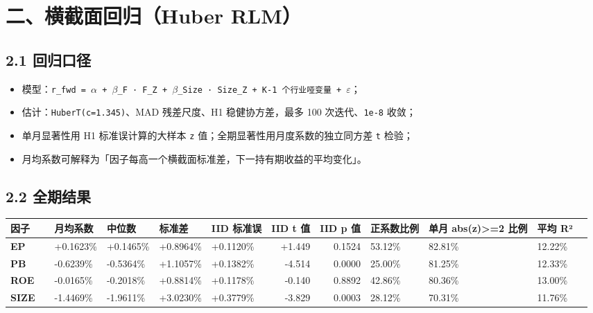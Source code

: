 \documentclass[UTF8,a4paper,11pt]{ctexart}
\begin{document}
{}
\section*{二、横截面回归（Huber RLM）}

{}
\subsection*{2.1 回归口径}

\begin{itemize}[leftmargin=2em,itemsep=2pt,topsep=3pt]
\item 
模型：\texttt{r\_fwd = $\alpha$ + $\beta$\_F · F\_Z + $\beta$\_Size · Size\_Z + K-1 个行业哑变量 + $\varepsilon$}；

\item 
估计：\texttt{HuberT(c=1.345)}、MAD 残差尺度、H1 稳健协方差，最多 100 次迭代、\texttt{1e-8} 收敛；

\item 
单月显著性用 H1 标准误计算的大样本 \texttt{z} 值；全期显著性用月度系数的独立同方差 \texttt{t} 检验；

\item 
月均系数可解释为「因子每高一个横截面标准差，下一持有期收益的平均变化」。

\end{itemize}

{}
\subsection*{2.2 全期结果}

\begin{table}[htbp]
\centering
\scriptsize
\begin{tabularx}{\textwidth}{@{}YYYYYYRRYYYY@{}}
\toprule
因子 &  & 月均系数 & 中位数 & 标准差 & IID 标准误 & IID t 值 & IID p 值 & 正系数比例 & 单月 abs(z)>=2 比例 & 平均 R² &  \\
\midrule
\textbf{EP} &  & +0.1623\% & +0.1465\% & +0.8964\% & +0.1120\% & +1.449 & 0.1524 & 53.12\% & 82.81\% & 12.22\% &  \\
\textbf{PB} &  & -0.6239\% & -0.5364\% & +1.1057\% & +0.1382\% & -4.514 & 0.0000 & 25.00\% & 81.25\% & 12.33\% &  \\
\textbf{ROE} &  & -0.0165\% & -0.2018\% & +0.8814\% & +0.1178\% & -0.140 & 0.8892 & 42.86\% & 80.36\% & 13.00\% &  \\
\textbf{SIZE} &  & -1.4469\% & -1.9611\% & +3.0230\% & +0.3779\% & -3.829 & 0.0003 & 28.12\% & 70.31\% & 11.76\% &  \\
\bottomrule
\end{tabularx}
\end{table}
\end{document}
